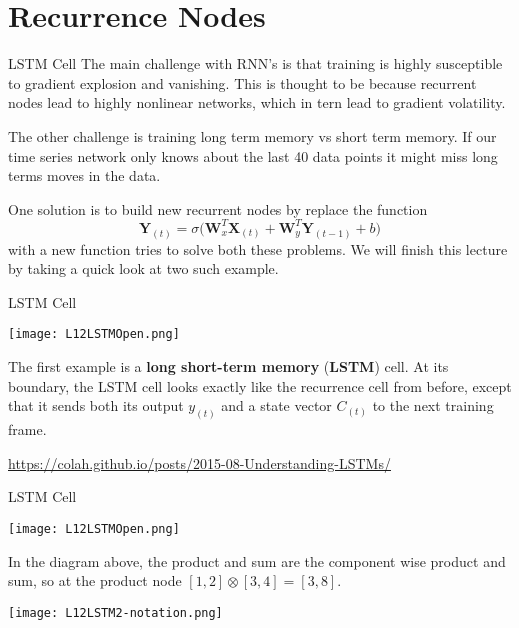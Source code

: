 \documentclass[10pt, table, dvipsnames,xcdraw, handout]{beamer}
\begin{document}
\section{Recurrence Nodes}



\begin{frame}[fragile]{LSTM Cell}
The main challenge with RNN's is that training is highly susceptible to gradient explosion and vanishing. This is thought to be because recurrent nodes lead to highly nonlinear networks, which in tern lead to gradient volatility. \pause\newline

The other challenge is training long term memory vs short term memory. If our time series network only knows about the last 40 data points it might miss long terms moves in the data. \pause\newline

One solution is to build new recurrent nodes by replace the function 
$$
\mathbf{Y}_{(t)} = \sigma\big( \mathbf{W}_x^T \mathbf{X}_{(t)} + \mathbf{W}_y^T \mathbf{Y}_{(t-1)} + b \big)
$$
with a new function tries to solve both these problems. We will finish this lecture by taking a quick look at two such example. 
\end{frame}


\begin{frame}[fragile]{LSTM Cell}
  \begin{minipage}[t][0.5\textheight][t]{\textwidth}
	\centering \texttt{[image: L12LSTMOpen.png]} 
  \end{minipage}
  \vfill
\begin{minipage}[t][0.5\textheight][t]{\textwidth}
The first example is a \textbf{long short-term memory} (\textbf{LSTM}) cell. At its boundary, the LSTM cell looks exactly like the recurrence cell from before, except that it sends both its output $y_{(t)}$ and a state vector $C_{(t)}$ to the next training frame. 

\url{https://colah.github.io/posts/2015-08-Understanding-LSTMs/}
\end{minipage}
\end{frame}


\begin{frame}[fragile]{LSTM Cell}
  \begin{minipage}[t][0.5\textheight][t]{\textwidth}
	\centering \texttt{[image: L12LSTMOpen.png]} 
  \end{minipage}
  \vfill
\begin{minipage}[t][0.5\textheight][t]{\textwidth}
In the diagram above, the product and sum are the component wise product and sum,  so at the product node $[1,2] \otimes [3,4] = [3,8]$.

\begin{center}
\texttt{[image: L12LSTM2-notation.png]} 
\end{center}

\end{minipage}
\end{frame}
\end{document}
